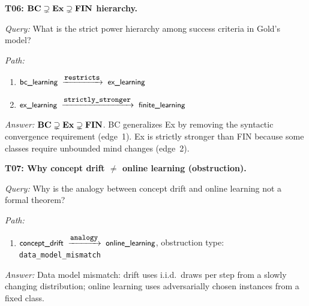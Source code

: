 \begin{traversal}
\textbf{T06: $\mathbf{BC} \supsetneq \mathbf{Ex} \supsetneq \mathbf{FIN}$ hierarchy.}\par\medskip
\emph{Query:} What is the strict power hierarchy among success criteria in Gold's model?\par
\emph{Path:}\par
\begin{enumerate}[leftmargin=2em, nosep]
  \item $\edge{bc\_learning}{restricts}{ex\_learning}$ \cite{CaseSmith1983}
  \item $\edge{ex\_learning}{strictly\_stronger}{finite\_learning}$ \cite{Gold1967}
\end{enumerate}
\emph{Answer:} $\mathbf{BC} \supsetneq \mathbf{Ex} \supsetneq \mathbf{FIN}$.  BC generalizes Ex by removing the syntactic convergence requirement (edge~1). Ex is strictly stronger than FIN because some classes require unbounded mind changes (edge~2).
\end{traversal}

\begin{traversal}
\textbf{T07: Why concept drift $\neq$ online learning (obstruction).}\par\medskip
\emph{Query:} Why is the analogy between concept drift and online learning not a formal theorem?\par
\emph{Path:}\par
\begin{enumerate}[leftmargin=2em, nosep]
  \item $\edge{concept\_drift}{analogy}{online\_learning}$, obstruction type: \texttt{data\_model\_mismatch}
\end{enumerate}
\emph{Answer:} Data model mismatch: drift uses i.i.d.\ draws per step from a slowly changing distribution; online learning uses adversarially chosen instances from a fixed class.
\end{traversal}

